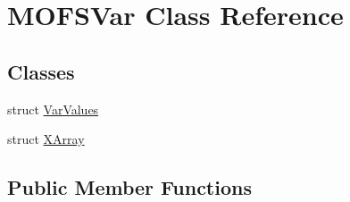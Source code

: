 \hypertarget{classMOFSVar}{\section{M\-O\-F\-S\-Var Class Reference}
\label{classMOFSVar}
}
\subsection*{Classes}
\begin{DoxyCompactItemize}
\item 
struct \hyperlink{structMOFSVar_1_1VarValues}{Var\-Values}
\item 
struct \hyperlink{structMOFSVar_1_1XArray}{X\-Array}
\end{DoxyCompactItemize}
\subsection*{Public Member Functions}
